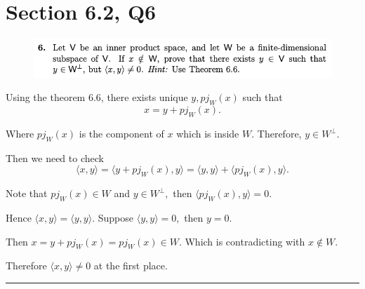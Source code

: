 \documentclass[12pt]{article}%
\begin{document}
\section{Section 6.2, Q6}
\begin{figure}[htp]
    \centering %
    \includegraphics[width = 15cm]{img/Q8.png}
\end{figure}

Using the theorem 6.6, there exists unique $y, pj_{W}(x)$ such that $$x=y+pj_{W}(x).$$ 

Where $pj_{W}(x)$ is the component of $x$ which is inside $W.$ Therefore, $y\in W^{\perp}.$

Then we need to check $$\langle x,y \rangle=\langle y+pj_{W}(x),y \rangle=\langle y,y \rangle+\langle pj_{W}(x),y \rangle.$$

Note that $pj_{W}(x) \in W$ and $y\in W^{\perp},$ then $\langle pj_{W}(x),y \rangle=0.$

Hence $\langle x,y \rangle=\langle y,y \rangle.$ Suppose $\langle y,y \rangle =0,$ then $y=0.$

Then $x=y+pj_{W}(x)=pj_{W}(x)\in W.$ Which is contradicting with $x \notin W.$ 

Therefore $\langle x,y \rangle \neq 0$ at the first place.

\noindent\rule[0.1ex]{\linewidth}{1pt}
\end{document}
